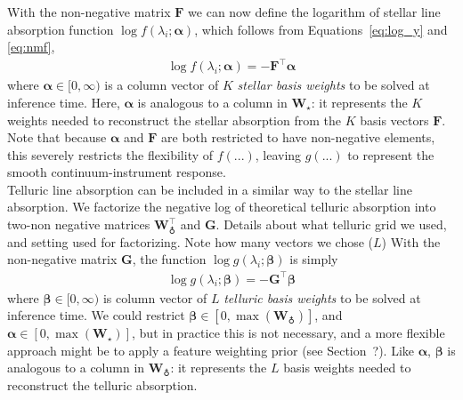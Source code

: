 \documentclass[modern]{aastex631}
\renewcommand{\vec}[1]{\mathbf{#1}}
\newcommand{\vecalpha}{\boldsymbol{\alpha}}
\newcommand{\vecbeta}{\boldsymbol{\beta}}
\newcommand{\vecW}{\mathbf{W}} %
\newcommand{\vecH}{\mathbf{H}} %
\newcommand{\vecX}{\mathbf{X}}
\newcommand{\transpose}{^\top}
\newcommand{\todo}[1]{\textcolor{tab:red}{#1}}
\begin{document}


\noindent{}With the non-negative matrix $\vec{F}$ we can now define the logarithm of stellar line absorption function $\log{f(\lambda_i;\vecalpha)}$, which follows from Equations~\ref{eq:log_y} and \ref{eq:nmf},
\begin{align}
    \log{f(\lambda_i;\vecalpha)} = -\vec{F}\transpose\vecalpha \label{eq:log-f}
\end{align}
where $\vecalpha \in [0, \infty)$ is a column vector of $K$ \emph{stellar basis weights} to be solved at inference time. Here, $\vecalpha$ is analogous to a column in $\vecW_\star$: it represents the $K$ weights needed to reconstruct the stellar absorption from the $K$ basis vectors $\vec{F}$. Note that because $\vecalpha$ and $\vec{F}$ are both restricted to have non-negative elements, this severely restricts the flexibility of $f(...)$, leaving $g(...)$ to represent the smooth continuum-instrument response. \\

Telluric line absorption can be included in a similar way to the stellar line absorption. We factorize the negative log of theoretical telluric absorption into two-non negative matrices $\vec{W}\transpose_\earth$ and $\vec{G}$.
\todo{Details about what telluric grid we used, and setting used for factorizing. Note how many vectors we chose ($L$)} With the non-negative matrix $\vec{G}$, the function $\log{g\left(\lambda_i;\vecbeta\right)}$ is simply
\begin{eqnarray}
    \log{g(\lambda_i;\vecbeta)} = -\vec{G}\transpose\vecbeta
\end{eqnarray}
where $\vecbeta \in [0, \infty)$ is column vector of $L$ \emph{telluric basis weights} to be solved at inference time. We could restrict $\vecbeta \in [0, \max(\vec{W}_\earth)]$, and $\vecalpha \in [0, \max(\vec{W}_\star)]$, but in practice this is not necessary, and a more flexible approach might be to apply a feature weighting prior (see Section~\todo{?}). Like $\vecalpha$, $\vecbeta$ is analogous to a column in $\vec{W}_\earth$: it represents the $L$ basis weights needed to reconstruct the telluric absorption.\\
\end{document}
